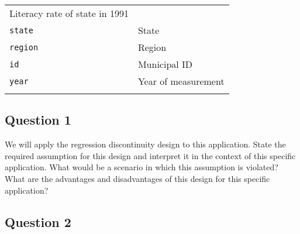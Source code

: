\documentclass[]{article}
\begin{document}
\begin{longtable}[c]{@{}ll@{}}
\begin{minipage}[t]{0.69\columnwidth}
Literacy rate of state in 1991
\end{minipage}
\\\addlinespace
\begin{minipage}[t]{0.24\columnwidth}\raggedright
\texttt{state}
\end{minipage} & \begin{minipage}[t]{0.69\columnwidth}\raggedright
State
\end{minipage}
\\\addlinespace
\begin{minipage}[t]{0.24\columnwidth}\raggedright
\texttt{region}
\end{minipage} & \begin{minipage}[t]{0.69\columnwidth}\raggedright
Region
\end{minipage}
\\\addlinespace
\begin{minipage}[t]{0.24\columnwidth}\raggedright
\texttt{id}
\end{minipage} & \begin{minipage}[t]{0.69\columnwidth}\raggedright
Municipal ID
\end{minipage}
\\\addlinespace
\begin{minipage}[t]{0.24\columnwidth}\raggedright
\texttt{year}
\end{minipage} & \begin{minipage}[t]{0.69\columnwidth}\raggedright
Year of measurement
\end{minipage}
\\\addlinespace
\bottomrule
\end{longtable}

\subsection{Question 1}\label{question-1}

We will apply the regression discontinuity design to this application.
State the required assumption for this design and interpret it in the
context of this specific application. What would be a scenario in which
this assumption is violated? What are the advantages and disadvantages
of this design for this specific application?

\subsection{Question 2}\label{question-2}
\end{document}
